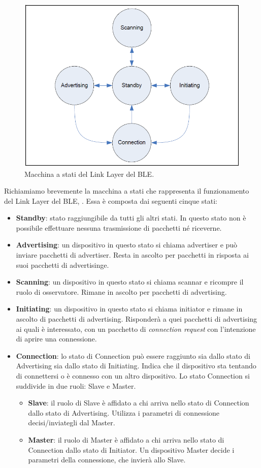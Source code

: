 \begin{figure}[t]
	\centering
	\includegraphics[width=0.8\linewidth]{Images/bt/bt_fsa}
	\caption[FSA Link Layer BLE]{Macchina a stati del Link Layer del \acs{BLE}.}
	\label{fig:bt_fsa2}
\end{figure}
Richiamiamo brevemente la macchina a stati che rappresenta il funzionamento del Link Layer del \acs{BLE}, . Essa è composta dai seguenti cinque stati:
\begin{itemize}
	\item \textbf{Standby}: stato raggiungibile da tutti gli altri stati. In questo stato non è possibile effettuare nessuna trasmissione di pacchetti né riceverne.
	\item \textbf{Advertising}: un dispositivo in questo stato si chiama advertiser e può inviare pacchetti di advertiser. Resta in ascolto per pacchetti in risposta ai suoi pacchetti di advertisinge.
	\item \textbf{Scanning}: un dispositivo in questo stato si chiama scannar e ricompre il ruolo di osservatore. Rimane in ascolto per pacchetti di advertising.
	\item \textbf{Initiating}: un dispositivo in questo stato si chiama initiator e rimane in ascolto di pacchetti di advertising. Risponderà a quei pacchetti di advertising ai quali è interessato, con un pacchetto di \textit{connection request} con l'intenzione di aprire una connessione.
	\item \textbf{Connection}: lo stato di Connection può essere raggiunto sia dallo stato di Advertising sia dallo stato di Initiating. Indica che il dispositivo sta tentando di connettersi o è connesso con un altro dispositivo. Lo stato Connection si suddivide in due ruoli: Slave e Master.
	\begin{itemize}
		\item \textbf{Slave}: il ruolo di Slave è affidato a chi arriva nello stato di Connection dallo stato di Advertising. Utilizza i parametri di connessione decisi/inviategli dal Master.
		\item \textbf{Master}: il ruolo di Master è affidato a chi arriva nello stato di Connection dallo stato di Initiator. Un dispositivo Master decide i parametri della connessione, che invierà allo Slave.
	\end{itemize}
\end{itemize}
